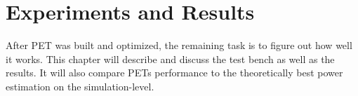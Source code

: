 \chapter{Experiments and Results}

After PET was built and optimized, the remaining task is to figure
out how well it works. This chapter will describe and discuss the test bench as well as
the results. It will also compare PETs performance to the theoretically best power estimation
on the simulation-level.




